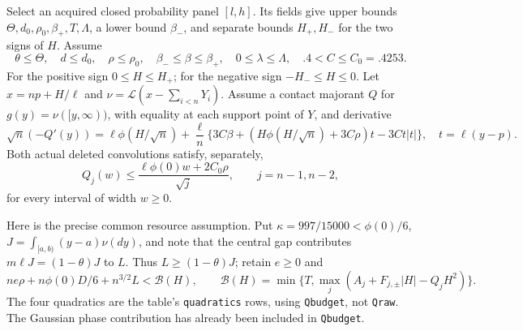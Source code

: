 Select an acquired closed probability panel $[l,h]$.
Its fields give upper bounds $\Theta,d_0,\rho_0,\beta_+,T,\Lambda$,
a lower bound $\beta_-$, and separate bounds $H_+,H_-$ for the two signs of
$H$. Assume
\[
 \theta\le\Theta,\quad d\le d_0,\quad \rho\le\rho_0,
 \quad \beta_-\le\beta\le\beta_+,\quad 0\le\lambda\le\Lambda,
 \quad .4<C\le C_0=.4253.
\]
For the positive sign $0\le H\le H_+$; for the negative sign
$-H_-\le H\le0$. Let $x=np+H/\ell$ and
$\nu=\mathcal L(x-\sum_{i<n}Y_i)$. Assume a contact majorant $Q$ for
$g(y)=\nu([y,\infty))$, with equality at each support point of $Y$,
and derivative
\begin{equation}\label{conf:derivative}
 \sqrt n(-Q'(y))=\ell\phi(H/\sqrt n)
 +\frac\ell n\{3C\beta+(H\phi(H/\sqrt n)+3C\rho)t-3Ct|t|\},
 \quad t=\ell(y-p).
\end{equation}
Both actual deleted convolutions satisfy, separately,
\begin{equation}\label{conf:concentration}
 Q_j(w)\le\frac{\ell\phi(0)w+2C_0\rho}{\sqrt j},
 \qquad j=n-1,n-2,
\end{equation}
for every interval of width $w\ge0$.

Here is the precise common resource assumption. Put
$\kappa=997/15000<\phi(0)/6$, $J=\int_{[a,b)}(y-a)\nu(dy)$,
and note that the central gap contributes $m\ell J=(1-\theta)J$ to $L$.
Thus $L\ge(1-\theta)J$; retain $e\ge0$ and
\begin{equation}\label{conf:budget}
 n e\rho+n\phi(0)D/6+n^{3/2}L<\mathcal B(H),\qquad
 \mathcal B(H)=\min\{T,\max_j(A_j+F_{j,\pm}|H|-Q_jH^2)\}.
\end{equation}
The four quadratics are the table's \texttt{quadratics} rows, using
\texttt{Qbudget}, not \texttt{Qraw}. The Gaussian phase contribution
has already been included in \texttt{Qbudget}.

